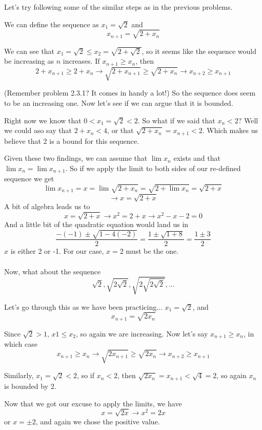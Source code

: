 Let's try following some of the similar steps as in the previous problems.

We can define the sequence as $x_1 = \sqrt{2}$ and
$$
x_{n+1} = \sqrt{2 + x_n}
$$

We can see that $x_1 = \sqrt{2} \leq x_2 = \sqrt{2 + \sqrt{2}}$, so it seems like the sequence would
be increasing as $n$ increases.
If $x_{n+1} \geq x_{n}$, then
$$
2 + x_{n+1} \geq 2 + x_n \rightarrow \sqrt{2 + x_{n+1}} \geq \sqrt{2 + x_n}
\rightarrow x_{n+2} \geq x_{n+1}
$$

(Remember problem 2.3.1? It comes in handy a lot!)
So the sequence does seem to be an increasing one.
Now let's see if we can argue that it is bounded.

Right now we know that $0 < x_1 = \sqrt{2} < 2$.
So what if we said that $x_n < 2$?
Well we could aso say that $2 + x_n < 4$, or that $\sqrt{2 + x_n} = x_{n+1} < 2$.
Which makes us believe that 2 is a bound for this sequence.

Given these two findings, we can assume that $\lim x_n$ exists and that $\lim x_n = \lim x_{n+1}$.
So if we apply the limit to both sides of our re-defined sequence we get
$$
\lim x_{n+1} = x = \lim \sqrt{2 + x_n} = \sqrt{2 + \lim x_n} = \sqrt{2 + x}
$$
$$
\rightarrow x = \sqrt{2 + x}
$$
A bit of algebra leads us to
$$
x = \sqrt{2 + x} \rightarrow x^2  = 2 + x \rightarrow
x^2 - x - 2 = 0
$$
And a little bit of the quadratic equation would land us in
$$
\frac{-(-1) \pm \sqrt{1 - 4 (-2)}}{2} = \frac{1 \pm \sqrt{1 + 8}}{2}
= \frac{1 \pm 3}{2}
$$
$x$ is either 2 or -1.
For our case, $x=2$ must be the one.
\\~\\

Now, what about the sequence
$$
\sqrt 2, \sqrt{2 \sqrt 2}, \sqrt{2 \sqrt{2 \sqrt 2}}, \ldots
$$

Let's go through this as we have been practicing...
$x_1 = \sqrt 2$, and
$$
x_{n+1} = \sqrt{2x_n}
$$

Since $\sqrt 2 > 1$, $x1 \leq x_2$, so again we are increasing.
Now let's say $x_{n+1} \geq x_n$, in which case
$$
x_{n+1} \geq x_n \rightarrow \sqrt{2x_{n+1}} \geq \sqrt{2x_n}
\rightarrow x_{n+2} \geq x_{n+1}
$$

Similarly, $x_1 = \sqrt 2 < 2$, so if $x_n < 2$, then $\sqrt{2x_n} =x_{n+1} < \sqrt{4} = 2$,
so again $x_n$ is bounded by 2.

Now that we got our excuse to apply the limits, we have
$$
x = \sqrt{2x} \rightarrow x^2 = 2x
$$
or $x = \pm 2$, and again we chose the positive value.
\\~\\



